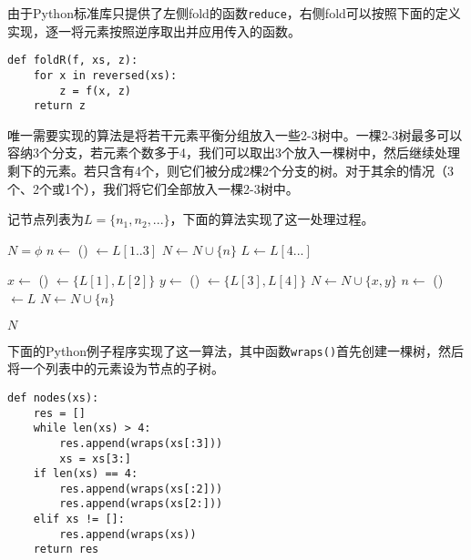 \documentclass[UTF8]{article}
\begin{document}
由于Python标准库只提供了左侧fold的函数\texttt{reduce}，右侧fold可以按照下面的定义实现，逐一将元素按照逆序取出并应用传入的函数。

\begin{lstlisting}
def foldR(f, xs, z):
    for x in reversed(xs):
        z = f(x, z)
    return z
\end{lstlisting}

唯一需要实现的算法是将若干元素平衡分组放入一些2-3树中。一棵2-3树最多可以容纳3个分支，若元素个数多于4，我们可以取出3个放入一棵树中，然后继续处理剩下的元素。若只含有4个，则它们被分成2棵2个分支的树。对于其余的情况（3个、2个或1个），我们将它们全部放入一棵2-3树中。

记节点列表为$L=\{ n_1, n_2, ... \}$，下面的算法实现了这一处理过程。

\begin{algorithmic}
  \State $N = \phi$
    \State $n \gets$ ()
    \State {} $\gets L[1..3]$  
    \State $N \gets N \cup \{ n \}$
    \State $L \gets L[4...]$ 
  \EndWhile

    \State $x \gets$ ()
    \State {} $\gets \{L[1], L[2]\}$
    \State $y \gets$ ()
    \State {} $\gets \{L[3], L[4]\}$
    \State $N \gets N \cup \{ x, y \}$
    \State $n \gets$ ()
    \State {} $\gets L$
    \State $N \gets N \cup \{ n \}$
  \EndIf

  \State \Return $N$
\EndFunction
\end{algorithmic}

下面的Python例子程序实现了这一算法，其中函数\texttt{wraps()}首先创建一棵树，然后将一个列表中的元素设为节点的子树。

\begin{lstlisting}
def nodes(xs):
    res = []
    while len(xs) > 4:
        res.append(wraps(xs[:3]))
        xs = xs[3:]
    if len(xs) == 4:
        res.append(wraps(xs[:2]))
        res.append(wraps(xs[2:]))
    elif xs != []:
        res.append(wraps(xs))
    return res
\end{lstlisting}
\end{document}
